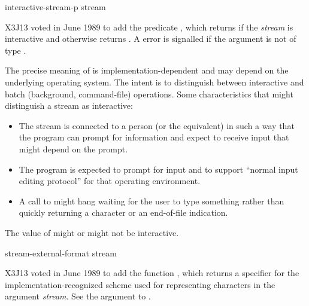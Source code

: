 \begin{newer}
\begin{defun}[Function]
interactive-stream-p stream

X3J13 voted in June 1989  to add the
predicate , which returns 
if the {\it stream\/} is interactive and otherwise returns .
A  error is signalled if the argument is not of type .

The precise meaning of  is implementation-dependent
and may depend on the underlying operating system.
The intent is to distinguish between interactive and batch (background,
command-file) operations.  Some characteristics that might
distinguish a stream as interactive:
\begin{itemize}
\item The stream is connected to a person (or the equivalent)
in such a way that the program can prompt for information and
expect to receive input that might depend on the prompt.
\item The program is expected to prompt for input and to support
``normal input editing protocol'' for that operating environment.
\item A call to  might hang waiting for the user to type something
rather than quickly returning a character or an end-of-file
indication.
\end{itemize}
The value of  might or might not be interactive.
\end{defun}
\end{newer}

\begin{newer}
\begin{defun}[Function]
stream-external-format stream

X3J13 voted in June 1989  to add the
function , which returns a
specifier for the implementation-recognized scheme used for
representing characters in the argument {\it stream}.
See the  argument to .
\end{defun}
\end{newer}
